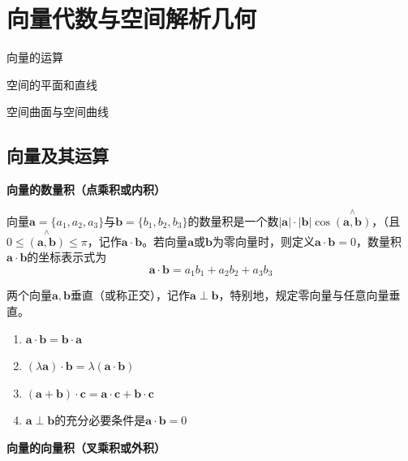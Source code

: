 \setcounter{chapter}{6}

\chapter{向量代数与空间解析几何}

\begin{introduction}
    \item 向量的运算
    \item 空间的平面和直线
    \item 空间曲面与空间曲线
\end{introduction}

\section{向量及其运算}
\textbf{向量的数量积（点乘积或内积）}

向量$\bm{a}=\{a_1,a_2,a_3\}$与$\bm{b}=\{b_1,b_2,b_3\}$的数量积是一个数$\left|\bm{a}\right|\cdot\left|\bm{b}\right|\cos\overset{\wedge}{(\bm{a},\bm{b})}$，（且$0\leq \overset{\wedge}{(\bm{a},\bm{b})}\leq \pi$，记作$\bm{a}\cdot\bm{b}$。若向量$\bm{a}$或$\bm{b}$为零向量时，则定义$\bm{a}\cdot\bm{b}=0$，数量积$\bm{a}\cdot\bm{b}$的坐标表示式为
\begin{equation}
    \bm{a}\cdot\bm{b}=a_1 b_1+a_2 b_2+a_3 b_3
    \nonumber
\end{equation}

两个向量$\bm{a},\bm{b}$垂直（或称正交），记作$\bm{a}\perp\bm{b}$，特别地，规定零向量与任意向量垂直。

\begin{property} \label{property:dot_product}
    \begin{enumerate}
        \item $\bm{a}\cdot\bm{b} = \bm{b}\cdot\bm{a}$
        \item $(\lambda \bm{a})\cdot\bm{b} = \lambda(\bm{a}\cdot\bm{b})$
        \item $(\bm{a}+\bm{b})\cdot\bm{c}=\bm{a}\cdot\bm{c}+\bm{b}\cdot\bm{c}$
        \item $\bm{a}\perp\bm{b}$的充分必要条件是$\bm{a}\cdot\bm{b}=0$
    \end{enumerate}
\end{property}
\vspace{2mm}

\textbf{向量的向量积（叉乘积或外积）}


